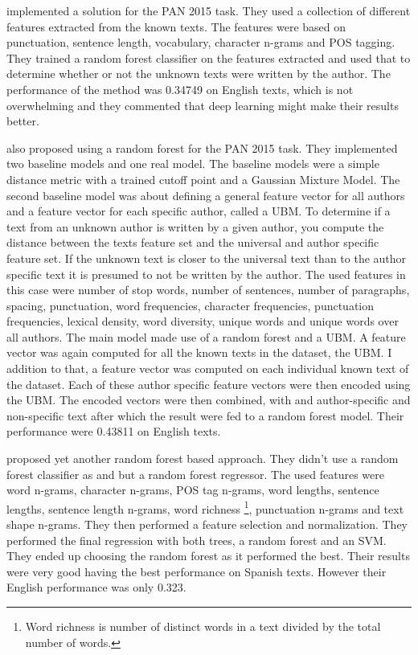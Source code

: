 \cite{maitra2015} implemented a solution for the PAN 2015 task. They used a
collection of different features extracted from the known texts. The features
were based on punctuation, sentence length, vocabulary, character n-grams and
\gls{POS} tagging. They trained a random forest classifier on the features
extracted and used that to determine whether or not the unknown texts were
written by the author. The performance of the method was 0.34749 on English
texts, which is not overwhelming and they commented that deep learning might
make their results better.

\cite{pacheco2015} also proposed using a random forest for the PAN 2015 task.
They implemented two baseline models and one real model. The baseline models
were a simple distance metric with a trained cutoff point and a Gaussian Mixture
Model. The second baseline model was about defining a general feature vector for
all authors and a feature vector for each specific author, called a \gls{UBM}.
To determine if a text from an unknown author is written by a given author,
you compute the distance between the texts feature set and the universal and
author specific feature set. If the unknown text is closer to the universal
text than to the author specific text it is presumed to not be written by
the author. The used features in this case were number of stop words, number
of sentences, number of paragraphs, spacing, punctuation, word frequencies,
character frequencies, punctuation frequencies, lexical density, word diversity,
unique words and unique words over all authors. The main model made use of a
random forest and a \gls{UBM}. A feature vector was again computed for all
the known texts in the dataset, the \gls{UBM}. I addition to that, a feature
vector was computed on each individual known text of the dataset. Each of these
author specific feature vectors were then encoded using the \gls{UBM}. The
encoded vectors were then combined, with and author-specific and non-specific
text after which the result were fed to a random forest model. Their performance
were 0.43811 on English texts.

\cite{bartoli2015b} proposed yet another random forest based approach.
They didn't use a random forest classifier as \cite{maitra2015} and
\cite{pacheco2015} but a random forest regressor. The used features were word
n-grams, character n-grams, \gls{POS} tag n-grams, word lengths, sentence
lengths, sentence length n-grams, word richness \footnote{Word richness is
number of distinct words in a text divided by the total number of words.},
punctuation n-grams and text shape n-grams. They then performed a feature
selection and normalization. They performed the final regression with both
trees, a random forest and an SVM. They ended up choosing the random forest as
it performed the best. Their results were very good having the best performance
on Spanish texts. However their English performance was only 0.323.

